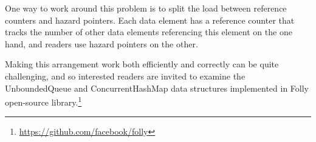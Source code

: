 One way to work around this problem is to split the load between
reference counters and hazard pointers.
Each data element has a reference counter that tracks the number
of other data elements referencing this element on the one hand,
and readers use hazard pointers on the other.

Making this arrangement work both efficiently and correctly can be
quite challenging, and so interested readers are invited to examine
the UnboundedQueue and ConcurrentHashMap data structures implemented in
Folly open-source library.\footnote{
	\url{https://github.com/facebook/folly}}

\fi



